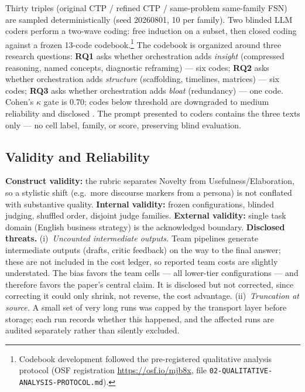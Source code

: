 \documentclass[12pt,a4paper]{article}
\begin{document}
Thirty triples (original CTP / refined CTP / same-problem same-family FSN) are
sampled deterministically (seed 20260801, 10 per family). Two blinded LLM coders
perform a two-wave coding: free induction on a subset, then closed coding
against a frozen 13-code codebook.\footnote{Codebook development followed the
pre-registered qualitative analysis protocol (OSF registration
\url{https://osf.io/mjb8x}, file \texttt{02-QUALITATIVE-ANALYSIS-PROTOCOL.md}).} The codebook is organized
around three research questions: \textbf{RQ1} asks whether orchestration adds
\emph{insight} (compressed reasoning, named concepts, diagnostic reframing) ---
six codes; \textbf{RQ2} asks whether orchestration adds \emph{structure}
(scaffolding, timelines, matrices) --- six codes; \textbf{RQ3} asks whether
orchestration adds \emph{bloat} (redundancy) --- one code. Cohen's $\kappa$ gate is 0.70; codes below threshold
are downgraded to medium reliability and disclosed \citep{Cohen1960}. The prompt
presented to coders contains the three texts only --- no cell label, family, or
score, preserving blind evaluation.

\subsection{Validity and Reliability}

\textbf{Construct validity:} the rubric separates Novelty from
Usefulness/Elaboration, so a stylistic shift (e.g.\ more discourse markers from
a persona) is not conflated with substantive quality. \textbf{Internal validity:}
frozen configurations, blinded judging, shuffled order, disjoint judge families.
\textbf{External validity:} single task domain (English business strategy) is
the acknowledged boundary. \textbf{Disclosed threats.} (i)~\emph{Uncounted intermediate outputs.} Team
pipelines generate intermediate outputs (drafts, critic feedback) on the way to
the final answer; these are not included in the cost ledger, so reported team
costs are slightly understated. The bias favors the team cells --- all
lower-tier configurations --- and therefore favors the paper's central claim.
It is disclosed but not corrected, since correcting it could only shrink, not
reverse, the cost advantage. (ii)~\emph{Truncation at source.} A small set of
very long runs was capped by the transport layer before storage; each run
records whether this happened, and the affected runs are audited separately
rather than silently excluded.
\end{document}
